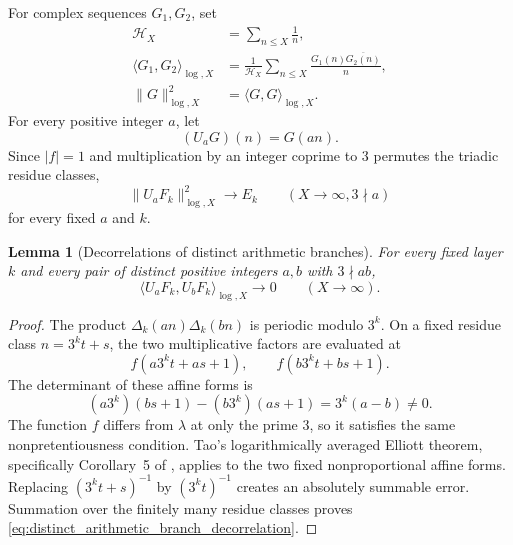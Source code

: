 \documentclass[11pt]{amsart}
\numberwithin{equation}{section}
\theoremstyle{plain}
\newtheorem{lemma}[theorem]{Lemma}
\theoremstyle{definition}
\theoremstyle{remark}
\begin{document}
For complex sequences $G_1,G_2$, set
\begin{align}
\mathcal H_X
&=
\sum_{n\leq X}\frac1n,
\label{eq:harmonic_normalizer_arithmetic}
\\
\langle G_1,G_2\rangle_{\log,X}
&=
\frac1{\mathcal H_X}
\sum_{n\leq X}\frac{G_1(n)\overline{G_2(n)}}{n},
\label{eq:logarithmic_inner_product_arithmetic}
\\
\|G\|_{\log,X}^2
&=
\langle G,G\rangle_{\log,X}.
\label{eq:logarithmic_norm_arithmetic}
\end{align}
For every positive integer $a$, let
\begin{equation}
(U_aG)(n)=G(an).
\label{eq:arithmetic_dilation_operator}
\end{equation}
Since $|f|=1$ and multiplication by an integer coprime to $3$ permutes the triadic residue classes,
\begin{equation}
\|U_aF_k\|_{\log,X}^2\longrightarrow E_k
\qquad(X\to\infty, 3\nmid a)
\label{eq:dilated_layer_energy_limit}
\end{equation}
for every fixed $a$ and $k$.

\begin{lemma}[Decorrelations of distinct arithmetic branches]
\label{lem:distinct_arithmetic_branch_decorrelation}
For every fixed layer $k$ and every pair of distinct positive integers $a,b$ with $3\nmid ab$,
\begin{equation}
\langle U_aF_k,U_bF_k\rangle_{\log,X}
\longrightarrow0
\qquad(X\to\infty).
\label{eq:distinct_arithmetic_branch_decorrelation}
\end{equation}
\end{lemma}

\begin{proof}
The product $\Delta_k(an)\Delta_k(bn)$ is periodic modulo $3^k$.  On a fixed residue class $n=3^kt+s$, the two multiplicative factors are evaluated at
\begin{equation}
f(a3^kt+as+1),
\qquad
f(b3^kt+bs+1).
\label{eq:arithmetic_branch_affine_forms}
\end{equation}
The determinant of these affine forms is
\begin{equation}
(a3^k)(bs+1)-(b3^k)(as+1)
=
3^k(a-b)\neq0.
\label{eq:arithmetic_branch_affine_determinant}
\end{equation}
The function $f$ differs from $\lambda$ at only the prime $3$, so it satisfies the same nonpretentiousness condition.  Tao's logarithmically averaged Elliott theorem, specifically Corollary~5 of \cite{Tao2016}, applies to the two fixed nonproportional affine forms.  Replacing $(3^kt+s)^{-1}$ by $(3^kt)^{-1}$ creates an absolutely summable error.  Summation over the finitely many residue classes proves \eqref{eq:distinct_arithmetic_branch_decorrelation}.
\end{proof}
\end{document}
